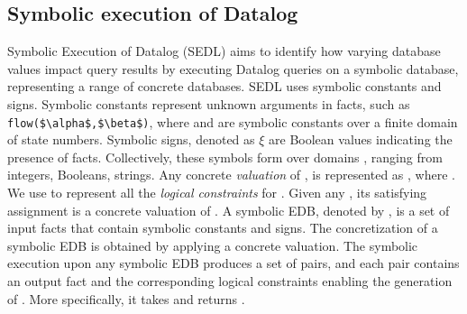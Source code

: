 \subsection{Symbolic execution of Datalog}
Symbolic Execution of Datalog (SEDL) aims to identify how varying database values impact query results by executing Datalog queries on a symbolic database, representing a range of concrete databases. 
SEDL uses symbolic constants and signs. 
Symbolic constants represent unknown arguments in facts, such as \lstinline[mathescape]{flow($\alpha$,$\beta$)}, where \code{\alpha} and \code{\beta} are symbolic constants over a finite domain of state numbers. 
Symbolic signs, denoted as $\xi$ are Boolean values indicating the presence of facts. 
Collectively, these symbols form  over domains , ranging from  integers, Booleans, strings. 
Any concrete \emph{valuation} of \code{\Sigma}, is represented as , where . 
We use \code{\psi^*} to represent all the \emph{logical constraints} for \code{\Sigma}. 
Given any \code{\psi}, its satisfying assignment is a concrete valuation of \code{\Sigma}. 
A symbolic EDB, denoted by \code{\SE}, is a set of input facts that contain symbolic constants and signs. 
The concretization of a symbolic EDB is obtained by applying a concrete valuation. 
The symbolic execution upon any symbolic EDB produces a set of pairs, and each pair contains an output fact \code{\relation} and the corresponding logical constraints enabling the generation of \code{\relation}. 
More specifically, it takes \code{\SE} and returns \code{{(\relation\times\psi^*)^*}}.

